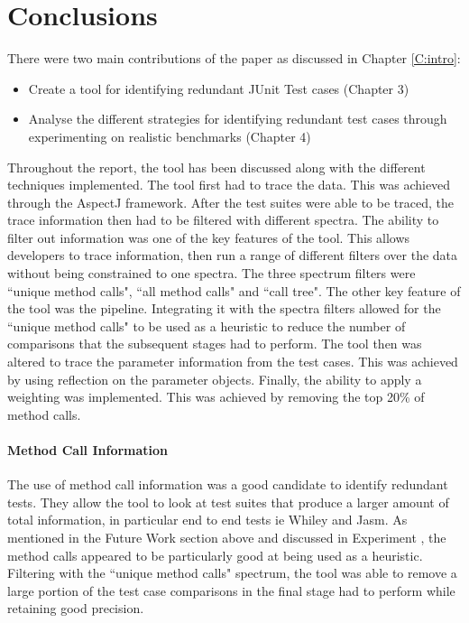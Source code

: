 \section{Conclusions}

There were two main contributions of the paper as discussed in Chapter \ref{C:intro}:

\begin{itemize}
\item Create a tool for identifying redundant JUnit Test cases (Chapter 3)
\item Analyse the different strategies for identifying redundant test cases through experimenting on realistic benchmarks (Chapter 4)
\end{itemize}

Throughout the report, the tool has been discussed along with the different techniques implemented. The tool first had to trace the data. This was achieved through the AspectJ framework. After the test suites were able to be traced, the trace information then had to be filtered with different spectra. The ability to filter out information was one of the key features of the tool. This allows developers to trace information, then run a range of different filters over the data without being constrained to one spectra. The three spectrum filters were ``unique method calls", ``all method calls" and ``call tree". The other key feature of the tool was the pipeline. Integrating it with the spectra filters allowed for the ``unique method calls" to be used as a heuristic to reduce the number of comparisons that the subsequent stages had to perform. The tool then was altered to trace the parameter information from the test cases. This was achieved by using reflection on the parameter objects. Finally, the ability to apply a weighting was implemented. This was achieved by removing the top 20\% of method calls.

\paragraph{Method Call Information}
The use of method call information was a good candidate to identify redundant tests. They allow the tool to look at test suites that produce a larger amount of total information, in particular end to end tests ie Whiley and Jasm. As mentioned in the Future Work section above and discussed in Experiment , the method calls appeared to be particularly good at being used as a heuristic. Filtering with the ``unique method calls" spectrum, the tool was able to remove a large portion of the test case comparisons in the final stage had to perform while retaining good precision.

